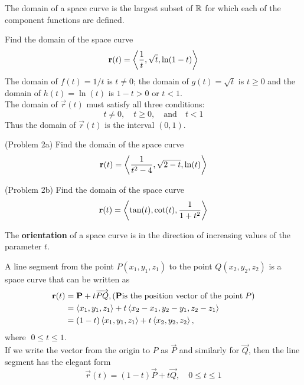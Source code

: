 \documentclass[handout]{ximera}
\begin{document}
The domain of a space curve is the largest subset of $\mathbb R$ for which each of the component functions are defined.

\begin{example}[Example 2]
Find the domain of the space curve
\[
\mathbf r(t) = \left\langle \frac{1}{t}, \sqrt t, \ln(1-t)\right\rangle
\]
 The domain of $f(t) = 1/t$ is $t \neq 0$; the domain of $g(t) = \sqrt t$ is $t \geq 0$ and the domain
 of $h(t) = \ln(t)$ is $1-t > 0$ or $t<1$.\\
 The domain of $\vec r(t)$ must satisfy all three conditions:
 \[
 t\neq 0, \quad t \geq 0, \quad \text{and} \quad t <1
 \]
 Thus the domain of $\vec r(t)$ is the interval $(0, 1)$.
 \end{example}
 
\begin{problem}(Problem 2a)
Find the domain of the space curve
\[
\mathbf r(t) = \left\langle \frac{1}{t^2 - 4}, \sqrt{2- t}, \ln (t)\right\rangle
\]
\end{problem}

\begin{problem}(Problem 2b)
Find the domain of the space curve
\[
\mathbf r(t) = \left\langle \tan(t), \cot(t), \frac{1}{1+t^2}\right\rangle
\]
\end{problem}


The \textbf{orientation} of a space curve is in the direction of increasing values of the parameter $t$.



A line segment from the point $P(x_1, y_1, z_1)$ to the point $Q(x_2, y_2, z_2)$ is a space curve that can be written as
\begin{align*}
\mathbf r(t) &= \mathbf P + t \overrightarrow{PQ}, (\mathbf P \text{is the position vector of the point} \;P)\\
          &=\left\langle x_1, y_1, z_1\right\rangle + t\left\langle x_2-x_1, y_2-y_1, z_2-z_1\right\rangle \\
          &= (1-t)\left\langle x_1, y_1, z_1\right\rangle + t\left\langle x_2, y_2, z_2\right\rangle, 
\end{align*}
where $\; 0 \leq t \leq 1$.\\
If we write the vector from the origin to $P$ as $\vec P$ and similarly for $\vec Q$, then the line segment has the elegant form 
\[
\vec r(t) = (1-t) \vec P + t \vec Q, \quad 0 \leq t \leq 1
\]
\begin{image}
\end{image}
\end{document}
